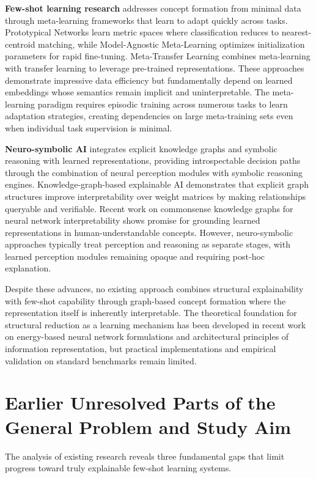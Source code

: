 \documentclass[a4paper,10pt]{article}
\begin{document}
\textbf{Few-shot learning research} addresses concept formation from minimal data through meta-learning frameworks that learn to adapt quickly across tasks. Prototypical Networks learn metric spaces where classification reduces to nearest-centroid matching, while Model-Agnostic Meta-Learning optimizes initialization parameters for rapid fine-tuning. Meta-Transfer Learning combines meta-learning with transfer learning to leverage pre-trained representations. These approaches demonstrate impressive data efficiency but fundamentally depend on learned embeddings whose semantics remain implicit and uninterpretable. The meta-learning paradigm requires episodic training across numerous tasks to learn adaptation strategies, creating dependencies on large meta-training sets even when individual task supervision is minimal.

\textbf{Neuro-symbolic AI} integrates explicit knowledge graphs and symbolic reasoning with learned representations, providing introspectable decision paths through the combination of neural perception modules with symbolic reasoning engines. Knowledge-graph-based explainable AI demonstrates that explicit graph structures improve interpretability over weight matrices by making relationships queryable and verifiable. Recent work on commonsense knowledge graphs for neural network interpretability shows promise for grounding learned representations in human-understandable concepts. However, neuro-symbolic approaches typically treat perception and reasoning as separate stages, with learned perception modules remaining opaque and requiring post-hoc explanation.

Despite these advances, no existing approach combines structural explainability with few-shot capability through graph-based concept formation where the representation itself is inherently interpretable. The theoretical foundation for structural reduction as a learning mechanism has been developed in recent work on energy-based neural network formulations and architectural principles of information representation, but practical implementations and empirical validation on standard benchmarks remain limited.

\section{Earlier Unresolved Parts of the General Problem and Study Aim}

The analysis of existing research reveals three fundamental gaps that limit progress toward truly explainable few-shot learning systems.
\end{document}
